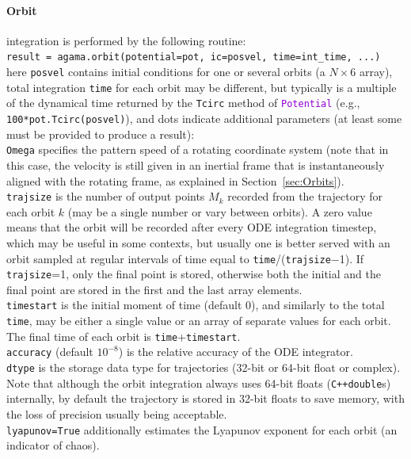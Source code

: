 \documentclass[12pt]{article}
\newcommand{\Cpp}  {\texttt{C++}\xspace}
\newcommand{\ttt}[1]{\textcolor{darkviolet}{\texttt{#1}}}
\newcommand{\ppp}[1]{\textcolor{darkolive} {\texttt{#1}}}
\begin{document}
\paragraph{Orbit} integration is performed by the following routine:\\
\texttt{result = agama.orbit(potential=pot, ic=posvel, time=int_time, ...)}\\
here \ppp{posvel} contains initial conditions for one or several orbits (a $N\times6$ array), total integration \ppp{time} for each orbit may be different, but typically is a multiple of the dynamical time returned by the \texttt{Tcirc} method of \ttt{Potential} (e.g., \texttt{100*pot.Tcirc(posvel)}), and dots indicate additional parameters (at least some must be provided to produce a result):\\
\ppp{Omega} specifies the pattern speed of a rotating coordinate system (note that in this case, the velocity is still given in an inertial frame that is instantaneously aligned with the rotating frame, as explained in Section~\ref{sec:Orbits}).\\
\ppp{trajsize} is the number of output points $M_k$ recorded from the trajectory for each orbit $k$ (may be a single number or vary between orbits). A zero value means that the orbit will be recorded after every ODE integration timestep, which may be useful in some contexts, but usually one is better served with an orbit sampled at regular intervals of time equal to \texttt{time}/(\texttt{trajsize}$-$1). If \texttt{trajsize}=1, only the final point is stored, otherwise both the initial and the final point are stored in the first and the last array elements.\\
\ppp{timestart} is the initial moment of time (default 0), and similarly to the total \texttt{time}, may be either a single value or an array of separate values for each orbit. The final time of each orbit is \texttt{time}+\texttt{timestart}.\\
\ppp{accuracy} (default $10^{-8}$) is the relative accuracy of the ODE integrator.\\
\ppp{dtype} is the storage data type for trajectories (32-bit or 64-bit float or complex). Note that although the orbit integration always uses 64-bit floats (\Cpp \texttt{double}s) internally, by default the trajectory is stored in 32-bit floats to save memory, with the loss of precision usually being acceptable.\\
\ppp{lyapunov=True} additionally estimates the Lyapunov exponent for each orbit (an indicator of chaos).\\
\end{document}
